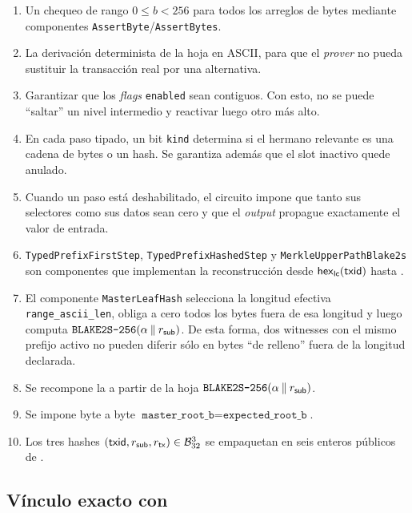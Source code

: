 \begin{enumerate}[noitemsep]
	\item Un chequeo de rango $0 \leq b < 256$ para todos los arreglos de bytes mediante componentes \texttt{AssertByte}/\texttt{AssertBytes}.
	\item La derivación determinista de la hoja en ASCII, para que el \textit{prover} no pueda sustituir la transacción real por una alternativa.
	\item Garantizar que los \textit{flags} \texttt{enabled} sean contiguos. Con esto, no se puede ``saltar'' un nivel intermedio y reactivar luego otro más alto.
	\item En cada paso tipado, un bit \texttt{kind} determina si el hermano relevante es una cadena de bytes o un hash. Se garantiza además que el slot inactivo quede anulado.
		\item Cuando un paso está deshabilitado, el circuito impone que tanto sus selectores como sus datos sean cero y que el \textit{output} propague exactamente el valor de entrada.
	\item \texttt{TypedPrefixFirstStep}, \texttt{TypedPrefixHashedStep} y \texttt{MerkleUpperPathBlake2s} son componentes que implementan la reconstrucción desde \(\mathsf{hex}_{\mathsf{lc}}(\mathsf{txid})\) hasta \SnapshotSubRoot.
	\item El componente \texttt{MasterLeafHash} selecciona la longitud efectiva \texttt{range\_ascii\_len}, obliga a cero todos los bytes fuera de esa longitud y luego computa $\texttt{BLAKE2S-256}(\alpha \mathbin{\|} r_{\mathsf{sub}})$. De esta forma, dos witnesses con el mismo prefijo activo no pueden diferir sólo en bytes ``de relleno'' fuera de la longitud declarada.
	\item Se recompone la \TxSetRoot a partir de la hoja $\texttt{BLAKE2S-256}(\alpha \mathbin{\|} r_{\mathsf{sub}})$.
	\item Se impone byte a byte $\texttt{master\_root\_b} = \texttt{expected\_root\_b}$.
	\item Los tres hashes $(\mathsf{txid}, r_{\mathsf{sub}}, r_{\mathsf{tx}}) \in \mathcal{B}_{32}^3$ se empaquetan en seis enteros públicos de .
\end{enumerate}

\subsection{Vínculo exacto con \MintingValidator}
\label{subsec:tx-snapshot-membership-vinculo-exacto-con-mintingvalidator}


